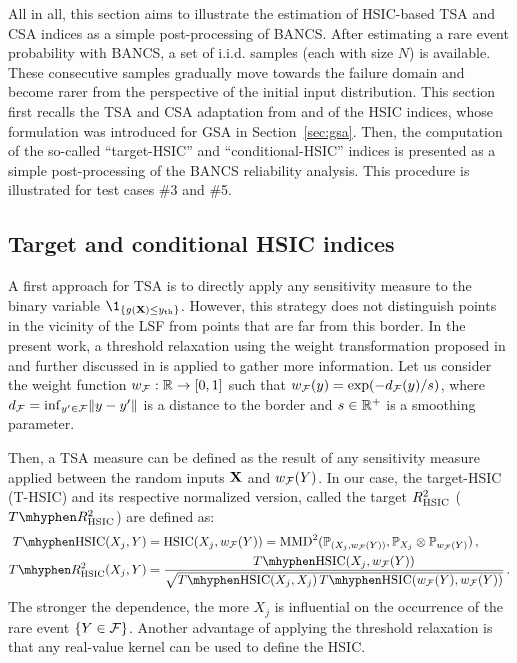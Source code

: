 All in all, this section aims to illustrate the estimation of HSIC-based TSA and CSA indices as a simple post-processing of BANCS. 
After estimating a rare event probability with BANCS, a set of i.i.d. samples (each with size $N$) is available. 
These consecutive samples gradually move towards the failure domain and become rarer from the perspective of the initial input distribution. 
This section first recalls the TSA and CSA adaptation from \citet{marrel_2018} and \citet{marrel_chabridon_2021} of the HSIC indices, whose formulation was introduced for GSA in Section~\ref{sec:gsa}.
Then, the computation of the so-called ``target-HSIC'' and ``conditional-HSIC'' indices is presented as a simple post-processing of the BANCS reliability analysis. 
This procedure is illustrated for test cases \#3 and \#5. 


\subsection{Target and conditional HSIC indices}

A first approach for TSA is to directly apply any sensitivity measure to the binary variable $\1_{\{g(\bX) \leq \yth\}}$. 
However, this strategy does not distinguish points in the vicinity of the LSF from points that are far from this border. 
In the present work, a threshold relaxation using the weight transformation proposed in \citet{marrel_2018} and further discussed in \citet{marrel_chabridon_2021} is applied to gather more information. 
Let us consider the weight function $w_{\mathcal{F}}: \mathbb{R} \rightarrow [0, 1]$ such that $w_{\mathcal{F}}(y) = \exp(-d_{\mathcal{F}}(y)/s)$, where $d_{\mathcal{F}} = \mathrm{inf}_{y'\in \mathcal{F}} \Vert y -y' \Vert$ is a distance to the border and $s\in\mathbb{R}^+$ is a smoothing parameter. 

Then, a TSA measure can be defined as the result of any sensitivity measure applied between the random inputs ${\bf X}$ and $w_{\mathcal{F}}(Y)$. 
In our case, the target-HSIC (T-HSIC) and its respective normalized version, called the target $R^2_{\mathrm{HSIC}}$ ($T \mhyphen R^2_{\HSIC}$) are defined as: 
\begin{subequations}
    \begin{align}
        T \mhyphen \HSIC(X_j, Y) & = \HSIC(X_j, w_{\iF}(Y)) = \MMD^2(\P_{(X_j, w_{\iF}(Y))}, \P_{X_j} \otimes \P_{w_{\iF}(Y)})\, ,\\
        T \mhyphen R^2_{\HSIC}(X_j, Y) &= \frac{T \mhyphen \HSIC(X_j, w_{\iF}(Y))}{\sqrt{T \mhyphen \HSIC(X_j, X_j) \, T \mhyphen \HSIC(w_{\iF}(Y), w_{\iF}(Y))}}\, .
    \end{align}
\end{subequations}
The stronger the dependence, the more $X_j$ is influential on the occurrence of the rare event $\{Y\in\mathcal{F}\}$.  
Another advantage of applying the threshold relaxation is that any real-value kernel can be used to define the HSIC. 

